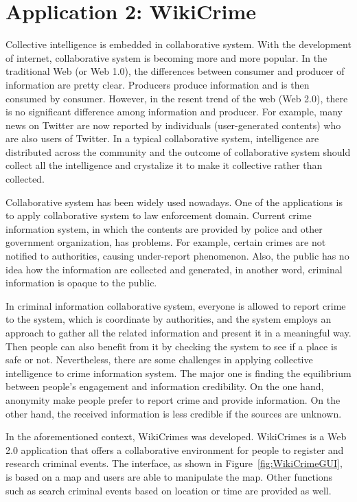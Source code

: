 \section{Application 2: WikiCrime}

Collective intelligence is embedded in collaborative system. With the development of internet, collaborative system is becoming more and more popular. In the traditional Web (or Web 1.0), the differences between consumer and producer of information are pretty clear. Producers produce information and is then consumed by consumer. However, in the resent trend of the web (Web 2.0), there is no significant difference among information and producer. For example, many news on Twitter are now reported by individuals (user-generated contents) who are also users of Twitter. In a typical collaborative system, intelligence are distributed across the community and the outcome of collaborative system should collect all the intelligence and crystalize it to make it collective rather than collected.

Collaborative system has been widely used nowadays. One of the applications is to apply collaborative system to law enforcement domain. Current crime information system, in which the contents are provided by police and other government organization, has problems. For example, certain crimes are not notified to authorities, causing under-report phenomenon. Also, the public has no idea how the information are collected and generated, in another word, criminal information is opaque to the public.

In criminal information collaborative system, everyone is allowed to report crime to the system, which is coordinate by authorities, and the system employs an approach to gather all the related information and present it in a meaningful way. Then people can also benefit from it by checking the system to see if a place is safe or not. Nevertheless, there are some challenges in applying collective intelligence to crime information system. The major one is finding the equilibrium between people’s engagement and information credibility. On the one hand, anonymity make people prefer to report crime and provide information. On the other hand, the received information is less credible if the sources are unknown.

In the aforementioned context, WikiCrimes was developed. WikiCrimes is a Web 2.0 application that offers a collaborative environment for people to register and research criminal events. The interface, as shown in Figure~\ref{fig:WikiCrimeGUI}, is based on a map and users are able to manipulate the map. Other functions such as search criminal events based on location or time are provided as well. 


